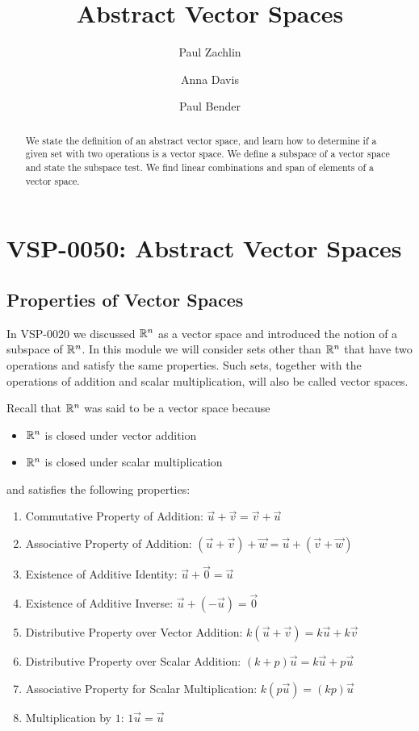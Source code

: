 \documentclass{ximera}
\author{Paul Zachlin \and Anna Davis \and Paul Bender} \title{Abstract Vector Spaces} \license{CC-BY-NC-SA}
\begin{document}
\begin{abstract}
We state the definition of an abstract vector space, and learn how to determine if a given set with two operations is a vector space. We define a subspace of a vector space and state the subspace test.  We find linear combinations and span of elements of a vector space.
\end{abstract}
\maketitle


\section*{VSP-0050: Abstract Vector Spaces}
\subsection*{Properties of Vector Spaces} 

In VSP-0020 we discussed $\mathbb{R}^n$ as a vector space and introduced the notion of a subspace of $\mathbb{R}^n$.  
In this module we will consider sets other than $\mathbb{R}^n$ that have two operations and satisfy the same properties.  Such sets, together with the operations of addition and scalar multiplication, will also be called vector spaces.

Recall that $\mathbb{R}^n$ was said to be a vector space because
\begin{itemize}
    \item[] $\mathbb{R}^n$ is closed under vector addition
    \item[] $\mathbb{R}^n$ is closed under scalar multiplication
\end{itemize}
and satisfies the following properties:

  \begin{enumerate}
  \item 
  Commutative Property of Addition:\quad
  $\vec{u}+\vec{v}=\vec{v}+\vec{u}$
  \item 
  Associative Property of Addition:\quad
  $(\vec{u}+\vec{v})+\vec{w}=\vec{u}+(\vec{v}+\vec{w})$
  \item 
  Existence of Additive Identity:\quad
  $\vec{u}+\vec{0}=\vec{u}$
  \item 
  Existence of Additive Inverse:\quad
  $\vec{u}+(-\vec{u})=\vec{0}$
  \item
  Distributive Property over Vector Addition:\quad
  $k(\vec{u}+\vec{v})=k\vec{u}+k\vec{v}$
  \item
  Distributive Property over Scalar Addition:\quad
  $(k+p)\vec{u}=k\vec{u}+p\vec{u}$
  \item 
  Associative Property for Scalar Multiplication:\quad
  $k(p\vec{u})=(kp)\vec{u}$
  \item 
  Multiplication by $1$:\quad
  $1\vec{u}=\vec{u}$
  \end{enumerate}
\end{document}
